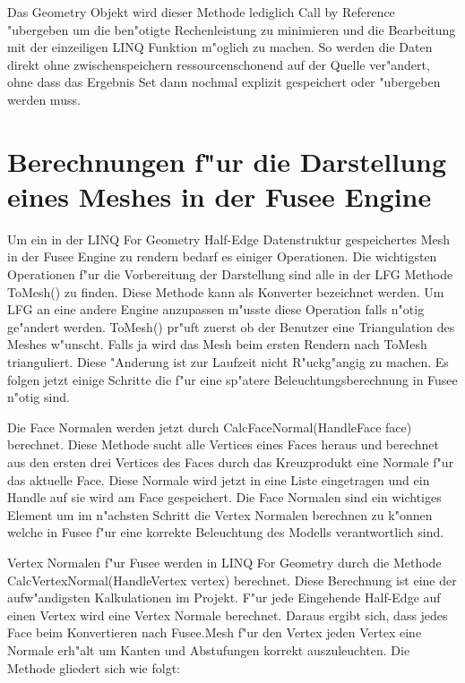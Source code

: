 \documentclass[pagesize, paper=a4, fontsize=12pt,titlepage=true, headings=small, headnosepline, abstractoff, liststotoc, nochapterprefix, plainheadsepline]{scrreprt}
\newcommand{\LFGS}{LINQ For Geometry }
\newcommand{\HES}{Half-Edge Datenstruktur }
\begin{document}
Das Geometry Objekt wird dieser Methode lediglich Call by Reference "ubergeben um die ben"otigte Rechenleistung zu minimieren und die Bearbeitung mit der einzeiligen LINQ Funktion m"oglich zu machen. So werden die Daten direkt ohne zwischenspeichern ressourcenschonend auf der Quelle ver"andert, ohne dass das Ergebnis Set dann nochmal explizit gespeichert oder "ubergeben werden muss.
\newpage
	\section {Berechnungen f"ur die Darstellung eines Meshes in der Fusee Engine}
	Um ein in der \LFGS \HES gespeichertes Mesh in der Fusee Engine zu rendern bedarf es einiger Operationen. Die wichtigsten Operationen f"ur die Vorbereitung der Darstellung sind alle in der LFG Methode ToMesh() zu finden. Diese Methode kann als Konverter bezeichnet werden. Um LFG an eine andere Engine anzupassen m"usste diese Operation falls n"otig ge"andert werden. ToMesh() pr"uft zuerst ob der Benutzer eine Triangulation des Meshes w"unscht. Falls ja wird das Mesh beim ersten Rendern nach ToMesh trianguliert. Diese "Anderung ist zur Laufzeit nicht R"uckg"angig zu machen. Es folgen jetzt einige Schritte die f"ur eine sp"atere Beleuchtungsberechnung in Fusee n"otig sind.

Die Face Normalen werden jetzt durch CalcFaceNormal(HandleFace face) berechnet. Diese Methode sucht alle Vertices eines Faces heraus und berechnet aus den ersten drei Vertices des Faces durch das Kreuzprodukt eine Normale f"ur das aktuelle Face. Diese Normale wird jetzt in eine Liste eingetragen und ein Handle auf sie wird am Face gespeichert. Die Face Normalen sind ein wichtiges Element um im n"achsten Schritt die Vertex Normalen berechnen zu k"onnen welche in Fusee f"ur eine korrekte Beleuchtung des Modells verantwortlich sind.

Vertex Normalen f"ur Fusee werden in \LFGS durch die Methode CalcVertexNormal(HandleVertex vertex) berechnet. Diese Berechnung ist eine der aufw"andigsten Kalkulationen im Projekt. F"ur jede Eingehende Half-Edge auf einen Vertex wird eine Vertex Normale berechnet. Daraus ergibt sich, dass jedes Face beim Konvertieren nach Fusee.Mesh f"ur den Vertex jeden Vertex eine Normale erh"alt um Kanten und Abstufungen korrekt auszuleuchten. Die Methode gliedert sich wie folgt:
\end{document}
